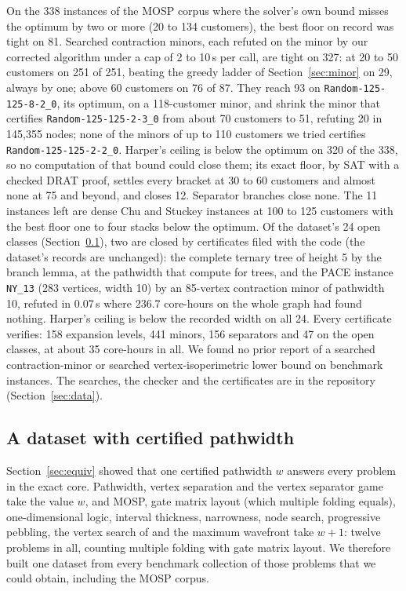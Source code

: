 On the 338 instances of the MOSP corpus where the solver's own bound misses
the optimum by two or more (20 to 134 customers), the best floor on record was
tight on 81. Searched contraction minors, each refuted on the minor by our
corrected algorithm under a cap of 2 to 10\,s per call, are tight on 327: at 20
to 50 customers on 251 of 251, beating the greedy ladder of
Section~\ref{sec:minor} on 29, always by one; above 60 customers on 76 of 87.
They reach 93 on \texttt{Random-125-125-8-2\_0}, its optimum, on a 118-customer
minor, and shrink the minor that certifies \texttt{Random-125-125-2-3\_0} from
about 70 customers to 51, refuting 20 in 145,355 nodes; none of the minors
of up to 110 customers we tried certifies \texttt{Random-125-125-2-2\_0}.
Harper's ceiling is below the optimum on 320 of the 338, so no computation of
that bound could close them; its exact floor, by SAT with a checked DRAT
proof, settles every bracket at 30 to 60 customers and almost none at 75 and
beyond, and closes 12. Separator branches close none. The 11 instances left
are dense Chu and Stuckey instances at 100 to 125 customers with the best
floor one to four stacks below the optimum. Of the dataset's 24 open classes
(Section~\ref{sec:dataset}), two are closed by certificates filed with the
code (the dataset's records are unchanged): the complete ternary tree of
height 5 by the branch lemma, at the pathwidth that \citet{EllisSudboroughTurner1994}
compute for trees, and the PACE instance \texttt{NY\_13} (283 vertices, width
10) by an 85-vertex contraction minor of pathwidth 10, refuted in 0.07\,s
where 236.7 core-hours on the whole graph had found nothing. Harper's ceiling
is below the recorded width on all 24. Every certificate verifies: 158
expansion levels, 441 minors, 156 separators and 47 on the open classes, at
about 35 core-hours in all. We found no prior report of a searched
contraction-minor or searched vertex-isoperimetric lower bound on benchmark
instances. The searches, the checker and the certificates are in the
repository (Section~\ref{sec:data}).

\subsection{A dataset with certified pathwidth}
\label{sec:dataset}

Section~\ref{sec:equiv} showed that one certified pathwidth $w$ answers every
problem in the exact core. Pathwidth, vertex separation and the vertex
separator game take the value $w$, and MOSP, gate matrix layout (which
multiple folding equals), one-dimensional logic, interval thickness,
narrowness, node search, progressive pebbling, the vertex search of
\citet{BRST1991} and the maximum wavefront take $w+1$: twelve problems in all, counting multiple folding with gate matrix layout. We therefore built one dataset from every benchmark collection of
those problems that we could obtain, including the MOSP corpus.

